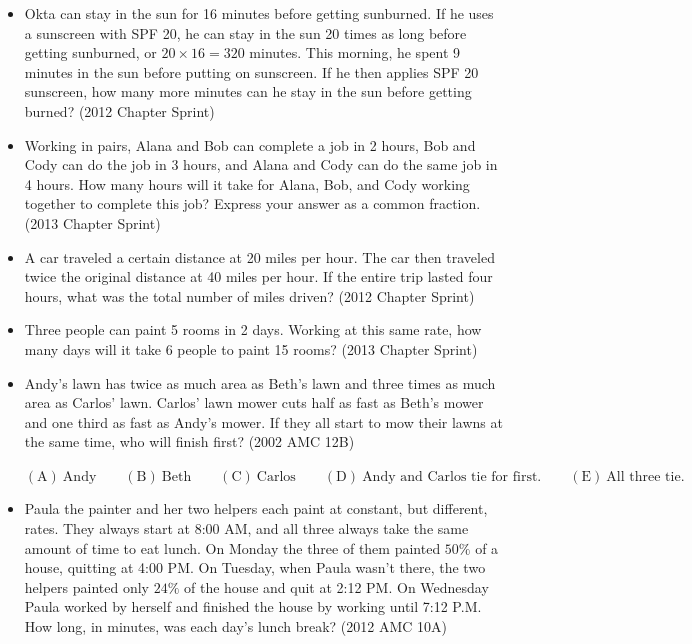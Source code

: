 \documentclass{article}
\begin{document}
\begin{itemize}
\item Okta can stay in the sun for 16 minutes before getting sunburned. If he uses a sunscreen with SPF 20, he can stay in the sun 20 times as long before getting sunburned, or $20\times 16=320$ minutes. This morning, he spent 9 minutes in the sun before putting on sunscreen. If he then applies SPF 20 sunscreen, how many more minutes can he stay in the sun before getting burned? (2012 Chapter Sprint)

\item Working in pairs, Alana and Bob can complete a job in 2 hours, Bob and Cody can do the job in 3 hours, and Alana and Cody can do the same job in 4 hours. How many hours will it take for Alana, Bob, and Cody working together to complete this job? Express your answer as a common fraction. (2013 Chapter Sprint)

\item A car traveled a certain distance at 20 miles per hour. The car then traveled twice the original distance at 40 miles per hour. If the entire trip lasted four hours, what was the total number of miles driven? (2012 Chapter Sprint)

\item Three people can paint 5 rooms in 2 days. Working at this same rate, how many days will it take 6 people to paint 15 rooms? (2013 Chapter Sprint)


\item Andy’s lawn has twice as much area as Beth’s lawn and three times as much area as Carlos’ lawn. Carlos’ lawn mower cuts half as fast as Beth’s mower and one third as fast as Andy’s mower. If they all start to mow their lawns at the same time, who will finish first? (2002 AMC 12B)

$\mathrm{(A)}\ \text{Andy}
\qquad\mathrm{(B)}\ \text{Beth}
\qquad\mathrm{(C)}\ \text{Carlos}
\qquad\mathrm{(D)}\ \text{Andy\ and \ Carlos\ tie\ for\ first.}
\qquad\mathrm{(E)}\ \text{All\ three\ tie.}$

\item Paula the painter and her two helpers each paint at constant, but different, rates. They always start at 8:00 AM, and all three always take the same amount of time to eat lunch. On Monday the three of them painted $50\%$ of a house, quitting at 4:00 PM. On Tuesday, when Paula wasn't there, the two helpers painted only $24\%$ of the house and quit at 2:12 PM. On Wednesday Paula worked by herself and finished the house by working until 7:12 P.M. How long, in minutes, was each day's lunch break? (2012 AMC 10A)




\end{itemize}
\end{document}
